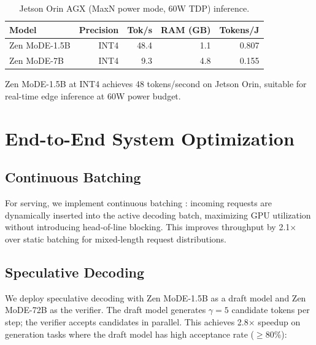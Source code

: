 \documentclass[11pt,a4paper]{article}
\begin{document}
\begin{table}[H]
\centering
\caption{Jetson Orin AGX (MaxN power mode, 60W TDP) inference.}
\begin{tabular}{lrrrr}
\toprule
\textbf{Model} & \textbf{Precision} & \textbf{Tok/s} & \textbf{RAM (GB)} & \textbf{Tokens/J} \\
\midrule
Zen MoDE-1.5B & INT4 & 48.4 & 1.1 & 0.807 \\
Zen MoDE-7B   & INT4 & 9.3  & 4.8 & 0.155 \\
\bottomrule
\end{tabular}
\label{tab:jetson}
\end{table}

Zen MoDE-1.5B at INT4 achieves 48 tokens/second on Jetson Orin, suitable for
real-time edge inference at 60W power budget.

\section{End-to-End System Optimization}
\label{sec:system}

\subsection{Continuous Batching}

For serving, we implement continuous batching \cite{yu2022orca}: incoming requests
are dynamically inserted into the active decoding batch, maximizing GPU utilization
without introducing head-of-line blocking. This improves throughput by 2.1$\times$
over static batching for mixed-length request distributions.

\subsection{Speculative Decoding}

We deploy speculative decoding \cite{leviathan2023fast} with Zen MoDE-1.5B as a draft
model and Zen MoDE-72B as the verifier. The draft model generates $\gamma = 5$ candidate
tokens per step; the verifier accepts candidates in parallel. This achieves 2.8$\times$
speedup on generation tasks where the draft model has high acceptance rate ($\geq$80\%):
\end{document}
